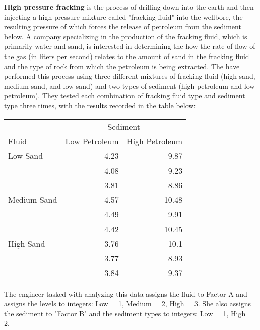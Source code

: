 \documentclass[addpoints]{examsetup}\usepackage[]{graphicx}\usepackage[]{color}
\begin{document}



\examCoverPage

\begin{questions}

\question[15] 

\textbf{High pressure fracking} is the process of drilling down into the earth and then injecting a high-pressure mixture called "fracking fluid" into the wellbore, the resulting pressure of which forces the release of petroleum from the sediment below.
A company specializing in the production of the fracking fluid, which is primarily water and sand, is interested in determining the how the rate of flow of the gas (in liters per second) relates to the amount of sand in the fracking fluid and the type of rock from which the petroleum is being extracted.
The have performed this process using three different mixtures of fracking fluid (high sand, medium sand, and low sand) and two types of sediment (high petroleum and low petroleum). 
They tested each combination of fracking fluid type and sediment type three times, with the results recorded in the table below:



\begin{table}[h]
\centering
\begin{tabular}{lrr}
 & \multicolumn{2}{c}{Sediment} \\
\cline{2-3}
Fluid & Low Petroleum & High Petroleum \\ \hline \hline
Low Sand & 4.23 & 9.87 \\
          & 4.08 & 9.23 \\
          & 3.81 & 8.86 \\
Medium Sand & 4.57 & 10.48 \\
            & 4.49 & 9.91 \\
            & 4.42 & 10.45 \\
High Sand & 3.76 & 10.1 \\
         & 3.77 & 8.93 \\
         & 3.84 & 9.37 \\
\hline
\end{tabular}
\end{table}

The engineer tasked with analyzing this data assigns the fluid to Factor A and assigns the levels to integers: Low = 1, Medium = 2, High = 3.
She also assigns the sediment to "Factor B" and the sediment types to integers: Low = 1, High = 2.


\end{questions}
\end{document}
